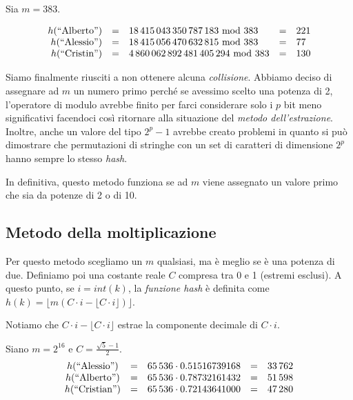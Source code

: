 \begin{eg}
    Sia $m=383$.

    \[\begin{array}[t]{rllcl}
        h(\text{``Alberto''}) & = & 18\,415\,043\,350\,787\,183\ \mathrm{mod}\ 383 & = & 221\\
        h(\text{``Alessio''}) & = & 18\,415\,056\,470\,632\,815\ \mathrm{mod}\ 383 & = & 77\\
        h(\text{``Cristin''}) & = & 4\,860\,062\,892\,481\,405\,294\ \mathrm{mod}\ 383 & = & 130
    \end{array}\]
\end{eg}\noindent
Siamo finalmente riusciti a non ottenere alcuna \emph{collisione}.
\newpage\noindent
Abbiamo deciso di assegnare ad $m$ un numero primo perché se avessimo scelto
una potenza di 2, l'operatore di modulo avrebbe finito per farci considerare solo
i $p$ bit meno significativi facendoci così ritornare alla situazione del
\emph{metodo dell'estrazione}. Inoltre, anche un valore del tipo $2^p-1$ avrebbe
creato problemi in quanto si può dimostrare che permutazioni di stringhe con un
set di caratteri di dimensione $2^p$ hanno sempre lo stesso \emph{hash}.

In definitiva, questo metodo funziona se ad $m$ viene assegnato un valore primo
che sia  da potenze di 2 o di 10.

\subsection{Metodo della moltiplicazione}
Per questo metodo scegliamo un $m$ qualsiasi, ma è meglio se è una potenza di due.
Definiamo poi una costante reale $C$ compresa tra 0 e 1 (estremi esclusi). A questo
punto, se $i=int(k)$, la \emph{funzione hash} è definita come $h(k)=\lfloor m
(C\cdot i-\lfloor C\cdot i\rfloor)\rfloor$.

Notiamo che $C\cdot i-\lfloor C\cdot i\rfloor$ estrae la componente decimale di
$C\cdot i$.

\begin{eg}
    Siano $m=2^{16}$ e $C=\frac{\sqrt{5}-1}{2}$\footnotemark.
    \[\begin{array}[t]{ccccc}
        h(\text{``Alessio''}) & = & 65\,536\cdot0.51516739168 & = & 33\,762\\
        h(\text{``Alberto''}) & = & 65\,536\cdot0.78732161432 & = & 51\,598\\
        h(\text{``Cristian''}) & = & 65\,536\cdot0.72143641000 & = & 47\,280
    \end{array}\]
\end{eg}


